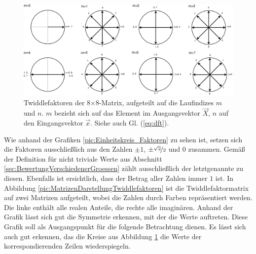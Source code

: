  


\begin{figure}[!ht]
 \centering
 \includegraphics[width=1\textwidth]{img/Twiddlefaktoren_Einheitskreis.eps}
 \caption{Twiddlefaktoren der 8$\times$8-Matrix, aufgeteilt auf die Laufindizes $m$ und $n$. $m$ bezieht sich auf das Element im Ausgangsvektor $\vec{X}$, $n$ auf den Eingangsvektor $\vec{x}$. Siehe auch Gl. (\ref{eq:dft}).}
 \label{pic:Twiddlefaktoren_Darstellung8x8}
\end{figure}

\vspace{0.5cm}
 
 Wie anhand der Grafiken \ref{pic:Einheitskreis_Faktoren} zu sehen ist, setzen sich die Faktoren ausschließlich aus den Zahlen $\pm1$, $\pm\nicefrac{\sqrt{2}}{2}$ und $0$ 
 zusammen. Gemäß der Definition für nicht triviale Werte aus Abschnitt \ref{sec:BewertungVerschiedenerGroessen} zählt ausschließlich der letztgenannte zu diesen.
 Ebenfalls ist ersichtlich, dass der Betrag aller Zahlen immer $1$ ist.
 In Abbildung \ref{pic:MatrizenDarstellungTwiddlefaktoren} ist die Twiddlefaktormatrix auf zwei Matrizen aufgeteilt, wobei die Zahlen durch Farben repräsentiert werden.
 Die linke enthält alle realen Anteile, die rechte alle imaginären. 
 Anhand der Grafik lässt sich gut die Symmetrie erkennen, mit der die Werte auftreten. Diese Grafik soll als 
 Ausgangspunkt für die folgende Betrachtung dienen.
 Es lässt sich auch gut erkennen, das die Kreise aus Abbildung \ref{pic:Twiddlefaktoren_Darstellung8x8} die Werte der korrespondierenden Zeilen wiederspiegeln.
 
